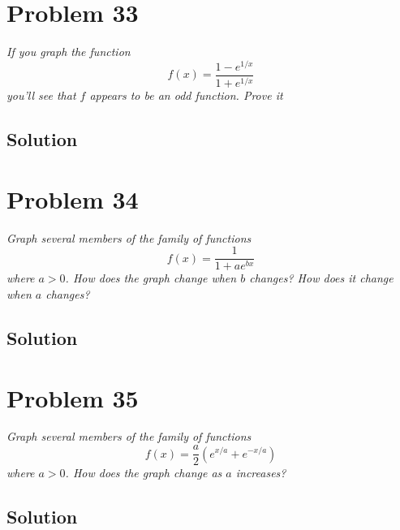 \documentclass[11pt]{article}
\newcommand{\soln}{\subsection*}
\newcommand{\qn}{\textit}
\begin{document}
\section*{Problem 33}

\qn{If you graph the function $$f(x)=\frac{1-e^{1/x}}{1+e^{1/x}}$$ you'll see that $f$ appears to be an odd function. Prove it}

\soln{Solution}

\section*{Problem 34}

\qn{Graph several members of the family of functions $$f(x)=\frac{1}{1+ae^{bx}}$$ where $a>0$. How does the graph change when $b$ changes? How does it change when $a$ changes?}

\soln{Solution}

\section*{Problem 35}

\qn{Graph several members of the family of functions $$f(x)=\frac{a}{2}(e^{x/a}+e^{-x/a})$$ where $a>0$. How does the graph change as $a$ increases?}

\soln{Solution}
\end{document}
